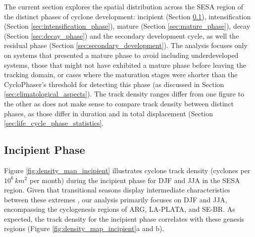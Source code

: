 The current section explores the spatial distribution across the SESA region of the distinct phases of cyclone development: incipient (Section \ref{sec:incipient_phase}), intensification (Section \ref{sec:intensification_phase}), mature (Section \ref{sec:mature_phase}), decay (Section \ref{sec:decay_phase}) and the secondary development cycle, as well the residual phase (Section \ref{sec:secondary_development}). The analysis focuses only on systems that presented a mature phase to avoid including underdeveloped systems, those that might not have exhibited a mature phase before leaving the tracking domain, or cases where the maturation stages were shorter than the CycloPhaser's threshold for detecting this phase (as discussed in Section \ref{sec:climatological_aspects}). The track density ranges differ from one figure to the other as does not make sense to compare track density between distinct phases, as those differ in duration and in total displacement (Section \ref{sec:life_cycle_phase_statistics}.


\subsection{Incipient Phase} \label{sec:incipient_phase}

Figure \ref{fig:density_map_incipient} illustrates cyclone track density (cyclones per \(10^6 \, km^2\) per month) during the incipient phase for DJF and JJA in the SESA region. Given that transitional seasons display intermediate characteristics between these extremes \citep[e.g.,]{gan1991surface,reboita2010south, crespo2021potential}, our analysis primarily focuses on DJF and JJA, encompassing the cyclogenesis regions of ARG, LA-PLATA, and SE-BR. As expected, the track density for the incipient phase correlates with these genesis regions (Figure \ref{fig:density_map_incipient}a and b).

